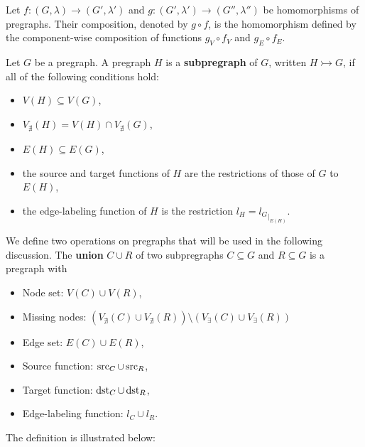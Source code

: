 \begin{definition} 
    \label{def:pregraph:composition}
    Let $f: (G,\lambda) \to (G',\lambda')$ and $g: (G',\lambda') \to (G'',\lambda'')$ be homomorphisms of pregraphs. Their composition, denoted by $g \circ f$, is the homomorphism defined by the component-wise composition of functions $g_V \circ f_V$ and $g_E \circ f_E$.
\end{definition}
\begin{definition} 
    \label{def:subpregraph} Let $G$ be a pregraph. A pregraph $H$ is a \textbf{subpregraph} of $G$, written $H \rightarrowtail G$, if all of the following conditions hold:
     \begin{itemize} 
            \item $V(H) \subseteq V(G)$, \item $V_{\nexists}(H) = V(H) \cap V_{\nexists}(G)$, 
            \item $E(H) \subseteq E(G)$, 
            \item the source and target functions of $H$ are the restrictions of those of $G$ to $E(H)$,
            \item the edge-labeling function of $H$ is the restriction $l_H = {l_G}_{|_{E(H)}}$. 
        \end{itemize} 
\end{definition}
We define two operations on pregraphs that will be used in the following discussion.
The \textbf{union} $C \cup R$ of two subpregraphs $C \subseteq G$ and $R \subseteq G$ is a pregraph with 
\begin{itemize}
    \item Node set: $ V(C) \cup V(R) $,
    \item Missing nodes:
        $(
            V_{\nexists}(C) \cup V_{\nexists}(R)) \setminus 
            (   V_\exists(C) \cup 
             V_\exists(R)  
                   )$
    \item Edge set: $ E(C) \cup E(R) $, 
    \item Source function: $ \operatorname{src}_C \cup \operatorname{src}_R $,  
    \item Target function: $ \operatorname{dst}_C \cup \operatorname{dst}_R $,  
    \item Edge-labeling function: $ l_C \cup l_R $.   
\end{itemize} 
The definition is illustrated below:
